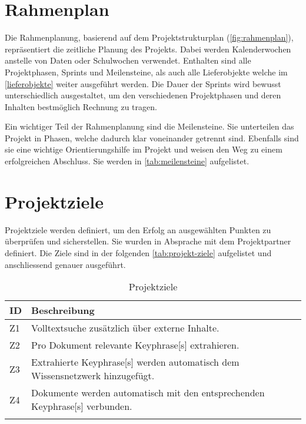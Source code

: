 \section{Rahmenplan}
Die Rahmenplanung, basierend auf dem Projektstrukturplan (\autoref{fig:rahmenplan}), repräsentiert die zeitliche Planung des Projekts. Dabei werden Kalenderwochen anstelle von Daten oder Schulwochen verwendet. Enthalten sind alle Projektphasen, Sprints und Meilensteine, als auch alle Lieferobjekte welche im \autoref{lieferobjekte} weiter ausgeführt werden. Die Dauer der Sprints wird bewusst unterschiedlich ausgestaltet, um den verschiedenen Projektphasen und deren Inhalten bestmöglich Rechnung zu tragen.

Ein wichtiger Teil der Rahmenplanung sind die Meilensteine. Sie unterteilen das Projekt in Phasen, welche dadurch klar voneinander getrennt sind. Ebenfalls sind sie eine wichtige Orientierungshilfe im Projekt und weisen den Weg zu einem erfolgreichen Abschluss. Sie werden in \autoref{tab:meilensteine} aufgelistet.

\section{Projektziele} \label{projektziele}
Projektziele werden definiert, um den Erfolg an ausgewählten Punkten zu überprüfen und sicherstellen. Sie wurden in Absprache mit dem Projektpartner definiert. Die Ziele sind in der folgenden \autoref{tab:projekt-ziele} aufgelistet und anschliessend genauer ausgeführt.



\begin{longtable}{|p{1cm}  | p{10.5cm}|}
  \hline
    ID & Beschreibung \\\hline
    Z1 & Volltextsuche zusätzlich über externe Inhalte.\\\hline
    Z2 & Pro Dokument relevante \gls{Keyphrase}[s] extrahieren.\\\hline
    Z3 & Extrahierte \gls{Keyphrase}[s] werden automatisch dem Wissensnetzwerk hinzugefügt.\\\hline
    Z4 & Dokumente werden automatisch mit den entsprechenden \gls{Keyphrase}[s] verbunden.\\\hline
    \caption{Projektziele}
  \label{tab:projekt-ziele}
\end{longtable}

